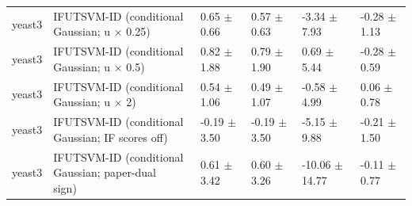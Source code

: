 \begin{table}[!t]
{\begin{tabular}{llllll}
yeast3 & \shortstack[l]{IFUTSVM-ID (conditional\\Gaussian; u \(\times\) 0.25)} & 0.65 \(\pm\) 0.66 & 0.57 \(\pm\) 0.63 & -3.34 \(\pm\) 7.93 & -0.28 \(\pm\) 1.13 \\
yeast3 & \shortstack[l]{IFUTSVM-ID (conditional\\Gaussian; u \(\times\) 0.5)} & 0.82 \(\pm\) 1.88 & 0.79 \(\pm\) 1.90 & 0.69 \(\pm\) 5.44 & -0.28 \(\pm\) 0.59 \\
yeast3 & \shortstack[l]{IFUTSVM-ID (conditional\\Gaussian; u \(\times\) 2)} & 0.54 \(\pm\) 1.06 & 0.49 \(\pm\) 1.07 & -0.58 \(\pm\) 4.99 & 0.06 \(\pm\) 0.78 \\
yeast3 & \shortstack[l]{IFUTSVM-ID (conditional\\Gaussian; IF scores off)} & -0.19 \(\pm\) 3.50 & -0.19 \(\pm\) 3.50 & -5.15 \(\pm\) 9.88 & -0.21 \(\pm\) 1.50 \\
yeast3 & \shortstack[l]{IFUTSVM-ID (conditional\\Gaussian; paper-dual\\sign)} & 0.61 \(\pm\) 3.42 & 0.60 \(\pm\) 3.26 & -10.06 \(\pm\) 14.77 & -0.11 \(\pm\) 0.77 \\
\hline
\end{tabular}%
}
\end{table}
